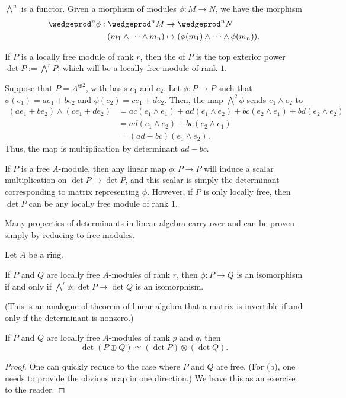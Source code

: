 $\bigwedge^n$ is a functor. Given a morphism 
of modules $\phi : M\to N$, we have the morphism
\begin{align*}
    \wedgeprod^n \phi : \wedgeprod^n M
    &\to \wedgeprod^n N \\
    (m_1\wedge\dots\wedge m_n)
    &\mapsto (\phi(m_1)\wedge\dots\wedge \phi(m_n)).
\end{align*}
\begin{definition}[Determinant]
    If $P$ is a locally free module of rank $r$,
    then the  of $P$
    is the top exterior power $\det P := \bigwedge^r P$,
    which will be a locally free module of rank $1$.
\end{definition}
\begin{example}
    Suppose that $P = A^{\oplus 2}$, with basis $e_1$ and $e_2$. 
    Let $\phi : P\to P$ such that $\phi(e_1)
    = ae_1 + be_2$ and $\phi(e_2) = ce_1+de_2$.
    Then, the map $\bigwedge^2\phi$ sends $e_1\wedge e_2$ 
    to 
    \begin{align*}
        (ae_1+be_2)\wedge (ce_1+de_2)
        &= ac(e_1\wedge e_1) + ad(e_1\wedge e_2)
        + bc(e_2\wedge e_1) + bd(e_2\wedge e_2) \\
        &= ad(e_1\wedge e_2) + bc(e_2\wedge e_1)  \\
        &= (ad-bc)(e_1\wedge e_2).
    \end{align*}
    Thus, the map is multiplication by determinant $ad-bc$.
\end{example}
If $P$ is a free $A$-module, then 
any linear map $\phi : P\to P$ will induce
a scalar multiplication on $\det P\to \det P$,
and this scalar is simply the determinant corresponding
to matrix representing $\phi$.
However, if $P$ is only locally free,
then $\det P$ can be any locally free module of rank $1$.

Many properties of determinants in linear algebra carry over
and can be proven simply by reducing to free modules.
\begin{theorem}
Let $A$ be a ring.
\begin{alphenum}
    \item If $P$ and $Q$ are locally free $A$-modules of rank $r$,
    then $\phi : P\to Q$ is an isomorphism if and only if
    $\bigwedge^r \phi : \det P\to \det Q$ is an isomorphism.

    (This is an analogue of theorem of linear
    algebra that a matrix is invertible if and only
    if the determinant is nonzero.)
    \item If $P$ and $Q$ are locally free $A$-modules
    of rank $p$ and $q$, then
    $$\det(P\oplus Q) \simeq (\det P)\otimes (\det Q).$$
\end{alphenum}
\end{theorem}
\begin{proof}
    One can quickly reduce to the case where $P$ and $Q$ are free. (For (b), one needs to provide the obvious
    map in one direction.)
    We leave this as an exercise to the reader.
\end{proof}
